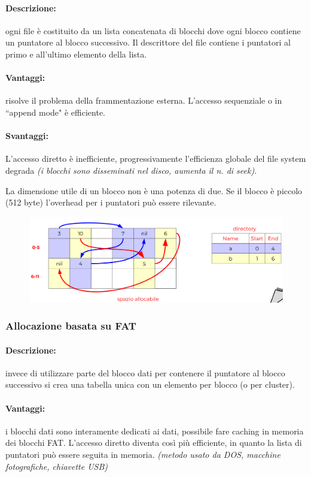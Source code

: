 \paragraph{Descrizione:} ogni file è costituito da un lista concatenata di blocchi dove ogni blocco contiene un puntatore al blocco successivo. Il descrittore del file contiene i puntatori al primo e all’ultimo elemento della lista.

\paragraph{Vantaggi:} risolve il problema della frammentazione esterna. L’accesso sequenziale o in “append mode" è efficiente.
\paragraph{Svantaggi:} L’accesso diretto è inefficiente, progressivamente l’efficienza globale del file system degrada
\textit{(i blocchi sono disseminati nel disco, aumenta il n. di seek)}.

La dimensione utile di un blocco non è una potenza di due.
Se il blocco è piccolo (512 byte) l’overhead per i puntatori può essere rilevante.

\begin{figure} [h]
    \centering
    \includegraphics[width=0.7\linewidth]{Images/Screenshot 2025-01-18 at 16-26-12 so-07-filesystem.pdf.png}
\end{figure}
\newpage
\subsubsection{Allocazione basata su FAT}

\paragraph{Descrizione:} invece di utilizzare parte del blocco dati per contenere il puntatore al blocco successivo
si crea una tabella unica con un elemento per blocco (o per cluster).

\paragraph{Vantaggi:}i blocchi dati sono interamente dedicati ai dati, possibile fare caching in memoria dei blocchi FAT. 
L'accesso diretto diventa così più efficiente, in quanto la lista di puntatori può essere seguita in memoria.
\textit{(metodo usato da DOS, macchine fotografiche, chiavette
USB)}
